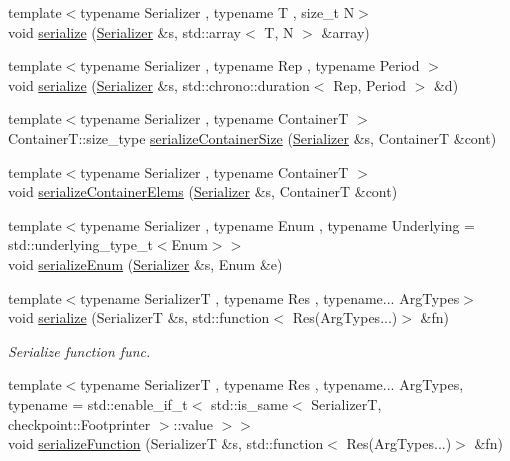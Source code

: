 \begin{DoxyCompactItemize}
{\footnotesize template$<$typename Serializer , typename T , size\+\_\+t N$>$ }\\void \hyperlink{namespacecheckpoint_a976e83bf5f22b7bfc5036fd829be039e}{serialize} (\hyperlink{structcheckpoint_1_1_serializer}{Serializer} \&s, std\+::array$<$ T, N $>$ \&array)
\item 
{\footnotesize template$<$typename Serializer , typename Rep , typename Period $>$ }\\void \hyperlink{namespacecheckpoint_aec244476371c452d9d9318b9d5b24401}{serialize} (\hyperlink{structcheckpoint_1_1_serializer}{Serializer} \&s, std\+::chrono\+::duration$<$ Rep, Period $>$ \&d)
\item 
{\footnotesize template$<$typename Serializer , typename ContainerT $>$ }\\Container\+T\+::size\+\_\+type \hyperlink{namespacecheckpoint_a3359595d5a4c6fcf5fc95069c71f869b}{serialize\+Container\+Size} (\hyperlink{structcheckpoint_1_1_serializer}{Serializer} \&s, ContainerT \&cont)
\item 
{\footnotesize template$<$typename Serializer , typename ContainerT $>$ }\\void \hyperlink{namespacecheckpoint_a9c880ba9bb9a106e784e06554b2fbcf2}{serialize\+Container\+Elems} (\hyperlink{structcheckpoint_1_1_serializer}{Serializer} \&s, ContainerT \&cont)
\item 
{\footnotesize template$<$typename Serializer , typename Enum , typename Underlying  = std\+::underlying\+\_\+type\+\_\+t$<$\+Enum$>$$>$ }\\void \hyperlink{namespacecheckpoint_a5f368cb543eec78bb608a68fe2401562}{serialize\+Enum} (\hyperlink{structcheckpoint_1_1_serializer}{Serializer} \&s, Enum \&e)
\item 
{\footnotesize template$<$typename SerializerT , typename Res , typename... Arg\+Types$>$ }\\void \hyperlink{namespacecheckpoint_ad3043fe034b7bf1d0d864e1e819c84d4}{serialize} (SerializerT \&s, std\+::function$<$ Res(Arg\+Types...)$>$ \&fn)
\begin{DoxyCompactList}\small\item\em Serialize function {\ttfamily func}. \end{DoxyCompactList}\item 
{\footnotesize template$<$typename SerializerT , typename Res , typename... Arg\+Types, typename  = std\+::enable\+\_\+if\+\_\+t$<$    std\+::is\+\_\+same$<$      Serializer\+T,      checkpoint\+::\+Footprinter    $>$\+::value  $>$$>$ }\\void \hyperlink{namespacecheckpoint_a4161978e6d6de385d942cbcbe659817a}{serialize\+Function} (SerializerT \&s, std\+::function$<$ Res(Arg\+Types...)$>$ \&fn)

\end{DoxyCompactItemize}
